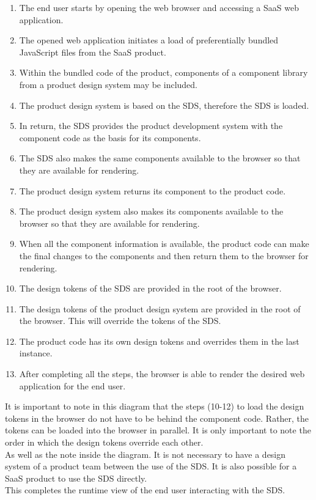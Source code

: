\begin{enumerate}
    \item The end user starts by opening the web browser and accessing a \ac{SaaS} web application. 
    \item The opened web application initiates a load of preferentially bundled JavaScript files from the \ac{SaaS} product.
    \item  Within the bundled code of the product, components of a component library from a product design system may be included. 
    \item The product design system is based on the \acl{SDS}, therefore the \ac{SDS} is loaded.
    \item In return, the \ac{SDS} provides the product development system with the component code as the basis for its components.
    \item The \ac{SDS} also makes the same components available to the browser so that they are available for rendering.
    \item The product design system returns its component to the product code.
    \item The product design system also makes its components available to the browser so that they are available for rendering.
    \item When all the component information is available, the product code can make the final changes to the components and then return them to the browser for rendering.
    \item The design tokens of the \ac{SDS} are provided in the root of the browser.
    \item The design tokens of the product design system are provided in the root of the browser. This will override the tokens of the \ac{SDS}.
    \item The product code has its own design tokens and overrides them in the last instance.
    \item After completing all the steps, the browser is able to render the desired web application for the end user.
\end{enumerate}
It is important to note in this diagram that the steps (10-12) to load the design tokens in the browser do not have to be behind the component code. Rather, the tokens can be loaded into the browser in parallel. It is only important to note the order in which the design tokens override each other. \\
As well as the note inside the diagram. It is not necessary to have a design system of a product team between the use of the \ac{SDS}. It is also possible for a \ac{SaaS} product to use the \ac{SDS} directly.\\
This completes the runtime view of the end user interacting with the SDS. 
